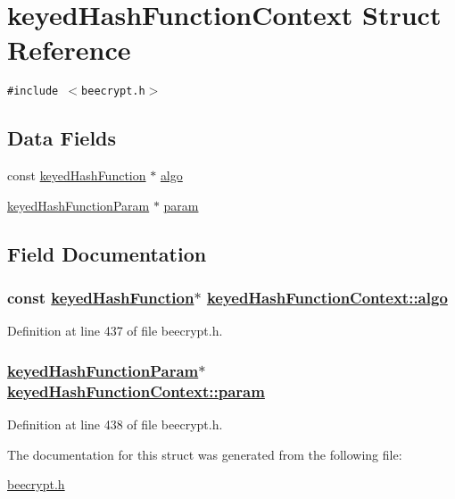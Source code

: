 \hypertarget{structkeyedHashFunctionContext}{
\section{keyed\-Hash\-Function\-Context Struct Reference}
\label{structkeyedHashFunctionContext}
}
{\tt \#include $<$beecrypt.h$>$}

\subsection*{Data Fields}
\begin{CompactItemize}
\item 
const \hyperlink{structkeyedHashFunction}{keyed\-Hash\-Function} $\ast$ \hyperlink{structkeyedHashFunctionContext_o0}{algo}
\item 
\hyperlink{group__HMAC__m_ga1}{keyed\-Hash\-Function\-Param} $\ast$ \hyperlink{structkeyedHashFunctionContext_o1}{param}
\end{CompactItemize}


\subsection{Field Documentation}
\hypertarget{structkeyedHashFunctionContext_o0}{
\subsubsection[algo]{\setlength{\rightskip}{0pt plus 5cm}const \hyperlink{structkeyedHashFunction}{keyed\-Hash\-Function}$\ast$ \hyperlink{structkeyedHashFunctionContext_o0}{keyed\-Hash\-Function\-Context::algo}}}
\label{structkeyedHashFunctionContext_o0}


Definition at line 437 of file beecrypt.h.\hypertarget{structkeyedHashFunctionContext_o1}{
\subsubsection[param]{\setlength{\rightskip}{0pt plus 5cm}\hyperlink{group__HMAC__m_ga1}{keyed\-Hash\-Function\-Param}$\ast$ \hyperlink{structkeyedHashFunctionContext_o1}{keyed\-Hash\-Function\-Context::param}}}
\label{structkeyedHashFunctionContext_o1}


Definition at line 438 of file beecrypt.h.

The documentation for this struct was generated from the following file:\begin{CompactItemize}
\item 
\hyperlink{beecrypt_8h}{beecrypt.h}\end{CompactItemize}
